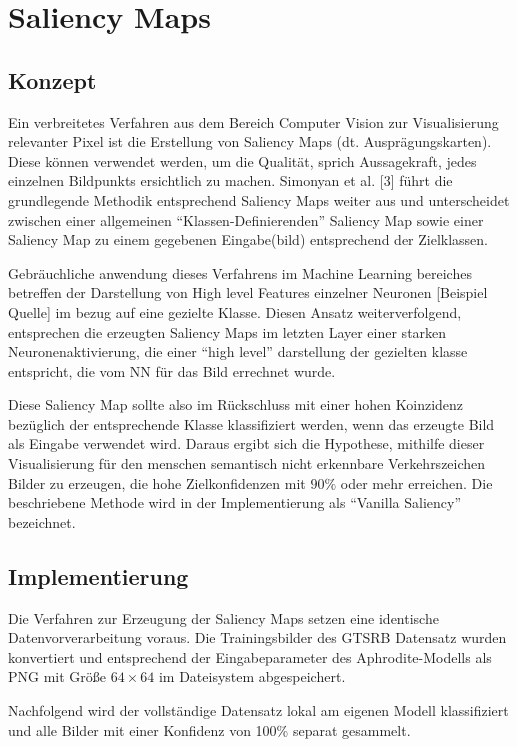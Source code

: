 \chapter{Saliency Maps}
\label{cha:saliency}

\section{Konzept}
Ein verbreitetes Verfahren aus dem Bereich Computer Vision zur Visualisierung relevanter Pixel ist die Erstellung von Saliency Maps (dt. Ausprägungskarten). Diese können verwendet werden, um die Qualität, sprich Aussagekraft, jedes einzelnen Bildpunkts ersichtlich zu machen. Simonyan et al. [3] führt die grundlegende Methodik entsprechend Saliency Maps weiter aus und unterscheidet zwischen einer allgemeinen “Klassen-Definierenden” Saliency Map sowie einer Saliency Map zu einem gegebenen Eingabe(bild) entsprechend der Zielklassen.


Gebräuchliche anwendung dieses Verfahrens im Machine Learning bereiches betreffen der Darstellung von High level Features einzelner Neuronen [Beispiel Quelle] im bezug auf eine gezielte Klasse. Diesen Ansatz weiterverfolgend, entsprechen die erzeugten Saliency Maps im letzten Layer einer starken Neuronenaktivierung, die einer “high level” darstellung der gezielten klasse entspricht, die vom NN für das Bild errechnet wurde. 


Diese Saliency Map sollte also im Rückschluss mit einer hohen Koinzidenz bezüglich der entsprechende Klasse klassifiziert werden, wenn das erzeugte Bild als Eingabe verwendet wird. Daraus ergibt sich die Hypothese, mithilfe dieser Visualisierung für den menschen semantisch nicht erkennbare Verkehrszeichen Bilder zu erzeugen, die hohe Zielkonfidenzen mit $90\%$ oder mehr erreichen. Die beschriebene Methode wird in der Implementierung als “Vanilla Saliency” bezeichnet.

\section{Implementierung}

Die Verfahren zur Erzeugung der Saliency Maps setzen eine identische Datenvorverarbeitung voraus. 
Die Trainingsbilder des GTSRB Datensatz wurden konvertiert und entsprechend der Eingabeparameter des Aphrodite-Modells als PNG mit Größe $64 \times 64 $ im Dateisystem abgespeichert.

Nachfolgend wird der vollständige Datensatz lokal am eigenen Modell klassifiziert und alle Bilder mit einer Konfidenz von 100\% separat gesammelt. 

